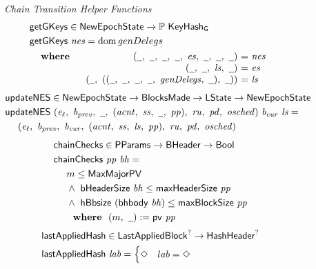\begin{figure}[htb]
  \emph{Chain Transition Helper Functions}
  \begin{align*}
      & \fun{getGKeys} \in \NewEpochState \to \powerset{\KeyHashGen} \\
      & \fun{getGKeys}~\var{nes} = \dom{genDelegs} \\
      &
      \begin{array}{lr@{~=~}l}
        \where
          & (\wcard,~\wcard,~\wcard,~\wcard,~\var{es},~\wcard,~\wcard,~\wcard)
          & \var{nes}
          \\
          & (\wcard,~\wcard,~\var{ls},~\wcard)
          & \var{es}
          \\
          & (\wcard,~((\wcard,~\wcard,~\wcard,~\wcard,~\var{genDelegs},~\wcard),~\wcard))
          & \var{ls}
      \end{array}
  \end{align*}
  \begin{align*}
      & \fun{updateNES} \in \NewEpochState \to \BlocksMade \to \LState \to \NewEpochState \\
      & \fun{updateNES}~
      (\var{e_\ell},~\var{b_{prev}},~\wcard,~(\var{acnt},~\var{ss},~\wcard,~\var{pp}),
       ~\var{ru},~\var{pd},~\var{osched})
          ~\var{b_{cur}}~\var{ls} = \\
      & ~~~~
      (\var{e_\ell},~\var{b_{prev}},~\var{b_{cur}},
       ~(\var{acnt},~\var{ss},~\var{ls},~\var{pp}),~\var{ru},~\var{pd},~\var{osched})
  \end{align*}
  \begin{align*}
      & \fun{chainChecks} \in \PParams \to \BHeader \to \Bool \\
      & \fun{chainChecks}~\var{pp}~\var{bh} = \\
      & ~~~~ m \leq \MaxMajorPV \\
      & ~~~~ \land~\bHeaderSize{bh} \leq \fun{maxHeaderSize}~\var{pp} \\
      & ~~~~ \land~\hBbsize{(\bhbody{bh})} \leq \fun{maxBlockSize}~\var{pp} \\
      & ~~~~ \where (m,~\wcard)\leteq\fun{pv}~\var{pp}
  \end{align*}
  \begin{align*}
      & \mathsf{lastAppliedHash} \in \mathsf{LastAppliedBlock}^? \to \mathsf{HashHeader}^? \\
      & \mathsf{lastAppliedHash}~\mathit{lab} =
        \begin{cases}
          \Diamond & lab = \Diamond \\

\end{cases}
\end{align*}
\end{figure}
